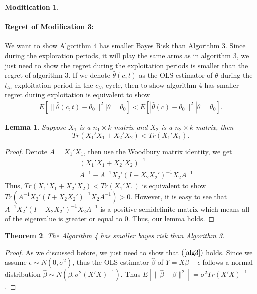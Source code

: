 \documentclass{article}
\newtheorem{theorem}{Theorem}
\newtheorem{lemma}[theorem]{Lemma}
\theoremstyle{plain}
\theoremstyle{definition}
\newtheorem{modification}{Moditication}
\begin{document}
\begin{modification}
\paragraph{Regret of Modification 3:}
We want to show Algorithm 4 has smaller Bayes Risk than Algorithm 3. Since during the exploration periods, it will play the same arms as in algorithm 3, we just need to show the regret during the exploitation periods is smaller than the regret of algorithm 3. If we denote $\hat{\theta}(c,t)$ as the OLS estimator of $\theta$ during the $t_{th}$ exploitation period in the $c_{th}$ cycle, then to show algorithm 4 has smaller regret during exploitation is equivalent to show 
\begin{align}
E[\|\hat{\theta}(c,t)-\theta_{0}\|^{2}|\theta=\theta_{0}] < E[|\hat{\theta}(c)-\theta_{0}\|^{2}|\theta=\theta_{0}]. \label{alg3}
\end{align}
\begin{lemma}
Suppose $X_{1}$ is a $n_{1}\times k $ matrix and $X_{2}$ is a $n_{2}\times k$ matrix, then
\begin{equation}
Tr(X_{1}'X_{1}+X_{2}'X_{2}) < Tr(X_{1}'X_{1}). \nonumber
\end{equation}
\end{lemma}
\begin{proof}
Denote $A=X_{1}'X_{1}$, then use the Woodbury matrix identity, we get
\begin{align}
&(X_{1}'X_{1}+X_{2}'X_{2})^{-1} \nonumber \\
=& A^{-1}-A^{-1}X_{2}'(I+X_{2}X_{2}')^{-1}X_{2}A^{-1} \nonumber 
\end{align}
Thus, $Tr(X_{1}'X_{1}+X_{2}'X_{2}) < Tr(X_{1}'X_{1})$ is equivalent to show $Tr(A^{-1}X_{2}'(I+X_{2}X_{2}')^{-1}X_{2}A^{-1})>0$. However, it is easy to see that $A^{-1}X_{2}'(I+X_{2}X_{2}')^{-1}X_{2}A^{-1}$ is a positive semidefinite matrix which means all of the eigenvalue is greater or equal to 0. Thus, our lemma holds.
\end{proof}

\begin{theorem}
The Algorithm 4 has smaller bayes risk than Algorithm 3.
\end{theorem}
\begin{proof}
As we discussed before, we just need to show that $(\ref{alg3})$ holds. Since we assume $\epsilon\sim N(0,\sigma^{2})$, thus the OLS estimator $\hat{\beta}$ of $Y=X\beta+\epsilon$ follows a normal distribution $\hat{\beta}\sim N(\beta,\sigma^{2}(X'X)^{-1})$. Thus $E[\|\hat{\beta}-\beta\|^{2}]=\sigma^{2}Tr(X'X)^{-1}$. 


\end{proof}
\end{modification}
\end{document}
